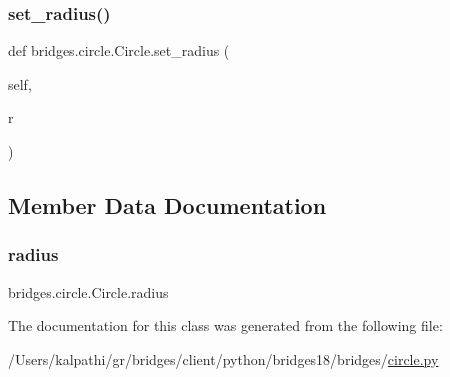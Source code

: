 \mbox{\label{classbridges_1_1circle_1_1_circle_aae91b89fceab6062de1afeaacd78a61d}} 
\subsubsection{\texorpdfstring{set\+\_\+radius()}{set\_radius()}}
{\footnotesize\ttfamily def bridges.\+circle.\+Circle.\+set\+\_\+radius (\begin{DoxyParamCaption}\item[{}]{self,  }\item[{}]{r }\end{DoxyParamCaption})}



\subsection{Member Data Documentation}
\mbox{\label{classbridges_1_1circle_1_1_circle_ab52ae32c28ea4175b815a7b04491205b}} 
\subsubsection{\texorpdfstring{radius}{radius}}
{\footnotesize\ttfamily bridges.\+circle.\+Circle.\+radius}



The documentation for this class was generated from the following file\+:\begin{DoxyCompactItemize}
\item 
/\+Users/kalpathi/gr/bridges/client/python/bridges18/bridges/\mbox{\hyperlink{circle_8py}{circle.\+py}}\end{DoxyCompactItemize}

